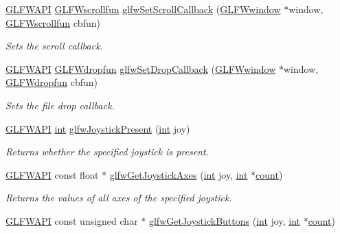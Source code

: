 \begin{DoxyCompactItemize}
\hyperlink{glfw3_8h_a56da5036b2cc259351ae22fd6439bb47}{G\+L\+F\+W\+A\+P\+I} \hyperlink{group__input_ga4687e2199c60a18a8dd1da532e6d75c9}{G\+L\+F\+Wscrollfun} \hyperlink{group__input_ga29011514e93368712a3063a28707ced3}{glfw\+Set\+Scroll\+Callback} (\hyperlink{group__window_ga3c96d80d363e67d13a41b5d1821f3242}{G\+L\+F\+Wwindow} $\ast$window, \hyperlink{group__input_ga4687e2199c60a18a8dd1da532e6d75c9}{G\+L\+F\+Wscrollfun} cbfun)
\begin{DoxyCompactList}\small\item\em Sets the scroll callback. \end{DoxyCompactList}\item 
\hyperlink{glfw3_8h_a56da5036b2cc259351ae22fd6439bb47}{G\+L\+F\+W\+A\+P\+I} \hyperlink{group__input_gab71f4ca80b651462852e601caf308c4a}{G\+L\+F\+Wdropfun} \hyperlink{group__input_gad4fc40df63a5d0441ab06de9a585cc04}{glfw\+Set\+Drop\+Callback} (\hyperlink{group__window_ga3c96d80d363e67d13a41b5d1821f3242}{G\+L\+F\+Wwindow} $\ast$window, \hyperlink{group__input_gab71f4ca80b651462852e601caf308c4a}{G\+L\+F\+Wdropfun} cbfun)
\begin{DoxyCompactList}\small\item\em Sets the file drop callback. \end{DoxyCompactList}\item 
\hyperlink{glfw3_8h_a56da5036b2cc259351ae22fd6439bb47}{G\+L\+F\+W\+A\+P\+I} \hyperlink{wglew_8h_a500a82aecba06f4550f6849b8099ca21}{int} \hyperlink{group__input_ga7f81f22f355f4b7d315caf73cdfd9906}{glfw\+Joystick\+Present} (\hyperlink{wglew_8h_a500a82aecba06f4550f6849b8099ca21}{int} joy)
\begin{DoxyCompactList}\small\item\em Returns whether the specified joystick is present. \end{DoxyCompactList}\item 
\hyperlink{glfw3_8h_a56da5036b2cc259351ae22fd6439bb47}{G\+L\+F\+W\+A\+P\+I} const float $\ast$ \hyperlink{group__input_gaab9e573d808b088c5079c0f577d39448}{glfw\+Get\+Joystick\+Axes} (\hyperlink{wglew_8h_a500a82aecba06f4550f6849b8099ca21}{int} joy, \hyperlink{wglew_8h_a500a82aecba06f4550f6849b8099ca21}{int} $\ast$\hyperlink{glew_8h_a10b284d589000663becfbc6867a3a9f7}{count})
\begin{DoxyCompactList}\small\item\em Returns the values of all axes of the specified joystick. \end{DoxyCompactList}\item 
\hyperlink{glfw3_8h_a56da5036b2cc259351ae22fd6439bb47}{G\+L\+F\+W\+A\+P\+I} const unsigned char $\ast$ \hyperlink{group__input_ga3951bea72b5fb4870b1aa0e5c2e9c903}{glfw\+Get\+Joystick\+Buttons} (\hyperlink{wglew_8h_a500a82aecba06f4550f6849b8099ca21}{int} joy, \hyperlink{wglew_8h_a500a82aecba06f4550f6849b8099ca21}{int} $\ast$\hyperlink{glew_8h_a10b284d589000663becfbc6867a3a9f7}{count})

\end{DoxyCompactItemize}
